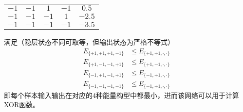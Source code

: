 \documentclass[reportComp]{thesis}
\begin{document}
\begin{answer}
\begin{center}
\begin{tabular}{cccc|c}
$-1$ & $-1$ & $1$ & $-1$ & $0.5$ \\
$-1$ & $-1$ & $-1$ & $1$ & $-2.5$ \\
$-1$ & $-1$ & $-1$ & $-1$ & $-3.5$ \\\hline
\end{tabular}
\end{center}
满足（隐层状态不同可取等，但输出状态为严格不等式）
\[\begin{aligned}
E_{\{+1,+1,+1,-1\}} &\leq E_{\{+1,+1,\cdot,\cdot\}}\\
E_{\{+1,-1,-1,+1\}} &\leq E_{\{+1,-1,\cdot,\cdot\}}\\
E_{\{-1,+1,-1,+1\}} &\leq E_{\{-1,+1,\cdot,\cdot\}}\\
E_{\{-1,-1,-1,-1\}} &\leq E_{\{-1,+1,\cdot,\cdot\}}
\end{aligned}\]
即每个样本输入输出在对应的4种能量构型中都最小，进而该网络可以用于计算XOR函数。
\end{answer}
\end{document}
